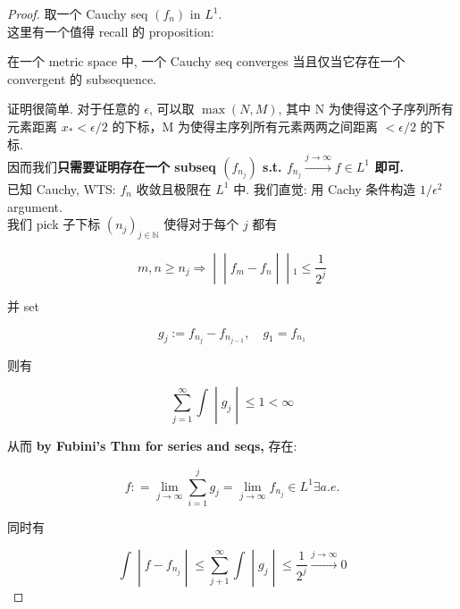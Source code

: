 \documentclass{qlnotes-export}
\begin{document}
\begin{proof}

取一个 Cauchy seq \((f_{n})\) in \(L^{1}\).\\
这里有一个值得 recall 的 proposition:

\begin{proposition}\label{prop-05-integration-of-real-and-complex-functions-proposition-005}

在一个 metric space 中, 一个 Cauchy seq converges 当且仅当它存在一个 convergent 的 subsequence.

\end{proposition}

证明很简单. 对于任意的 \(\epsilon\), 可以取 \(\max(N,M)\), 其中 N 为使得这个子序列所有元素距离 \(x_{\ast} < \epsilon/2\) 的下标，M 为使得主序列所有元素两两之间距离 \(< \epsilon/2\) 的下标.\\
因而我们\textbf{只需要证明存在一个 subseq \((f_{n_{j}})\) s.t. \(f_{n_{j}}\overset{j\rightarrow\infty}{\rightarrow}f \in L^{1}\) 即可.}\\
已知 Cauchy, WTS: \(f_{n}\) 收敛且极限在 \(L^{1}\) 中. 我们直觉: 用 Cachy 条件构造 \(1/\epsilon^{2}\) argument.\\
我们 pick 子下标 \((n_{j})_{j \in {\mathbb{N}}}\) 使得对于每个 \(j\) 都有

\[\left. m,n \geq n_{j}\Longrightarrow \middle| \middle| f_{m} - f_{n} \middle| \middle| {}_{1} \leq \frac{1}{2^{j}} \right.\]

并 set

\[g_{j} := f_{n_{j}} - f_{n_{j - 1}},\quad g_{1} = f_{n_{1}}\]

则有

\[\left. \sum\limits_{j = 1}^{\infty}\int \middle| g_{j} \middle| \leq 1 < \infty \right.\]

从而 \textbf{by Fubini's Thm for series and seqs,} 存在:

\[f: = \lim\limits_{j\rightarrow\infty}\sum\limits_{i = 1}^{j}g_{j} = \lim\limits_{j\rightarrow\infty}f_{n_{j}} \in L^{1}\exists a.e.\]

同时有

\[\left. \int \middle| f - f_{n_{j}} \middle| \leq \sum\limits_{j + 1}^{\infty}\int \middle| g_{j} \middle| \leq \frac{1}{2^{j}}\overset{j\rightarrow\infty}{\rightarrow}0 \right.\]

\end{proof}
\end{document}
